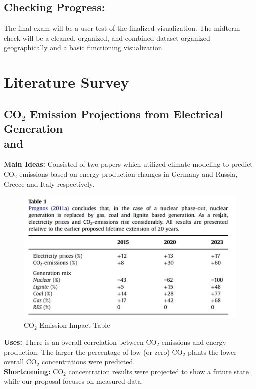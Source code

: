 \documentclass[sigconf,nonacm=true]{acmart}
\begin{document}
\subsection{Checking Progress:}
The final exam will be a user test of the finalized visualization. The midterm check will be a cleaned, organized, and combined dataset organized geographically and a basic functioning visualization. 

\section{Literature Survey}
\subsection{CO$_2$ Emission Projections from Electrical Generation\\ \cite[Page Count:~11]{Comfort_1_Bruninx} and \cite[Page Count:~17]{Comfort_2_HammonsT2006IoEP}}
\textbf{Main Ideas:} Consisted of two papers which utilized climate modeling to predict CO$_2$ emissions based on energy production changes in Germany and Russia, Greece and Italy respectively.
\begin{figure}[H]
	\centering
	\includegraphics[width=0.9\linewidth]{images/co2ProjectTable}
	\caption{CO$_2$ Emission Impact Table \protect\cite{Comfort_1_Bruninx}}
	\label{fig:co2german}
\end{figure}

\textbf{Uses:} There is an overall correlation between CO$_2$ emissions and energy production.  The larger the percentage of low (or zero) CO$_2$ plants the lower overall CO$_2$ concentrations were predicted. \\

\textbf{Shortcoming:} CO$_2$ concentration results were projected to show a future state while our proposal focuses on measured data.\\
\end{document}
